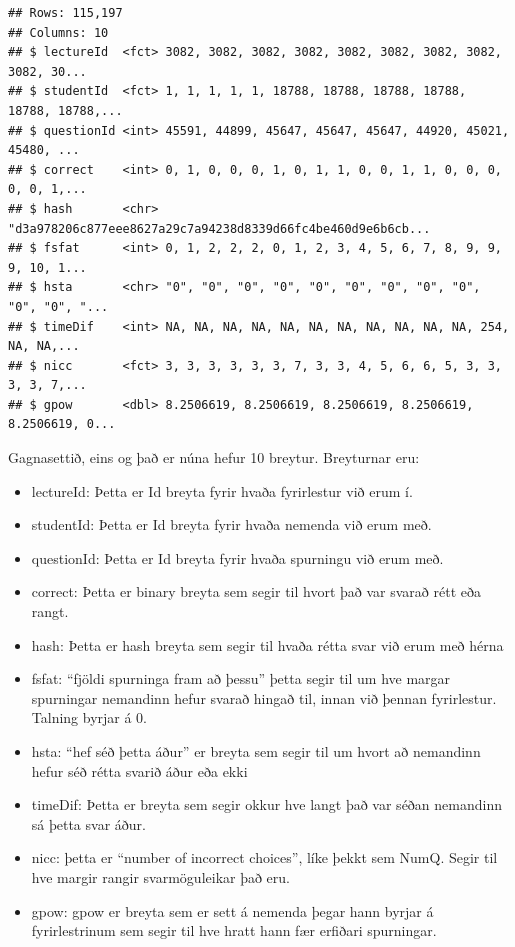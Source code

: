 \documentclass[
]{article}
\begin{document}
\begin{verbatim}
## Rows: 115,197
## Columns: 10
## $ lectureId  <fct> 3082, 3082, 3082, 3082, 3082, 3082, 3082, 3082, 3082, 30...
## $ studentId  <fct> 1, 1, 1, 1, 1, 18788, 18788, 18788, 18788, 18788, 18788,...
## $ questionId <int> 45591, 44899, 45647, 45647, 45647, 44920, 45021, 45480, ...
## $ correct    <int> 0, 1, 0, 0, 0, 1, 0, 1, 1, 0, 0, 1, 1, 0, 0, 0, 0, 0, 1,...
## $ hash       <chr> "d3a978206c877eee8627a29c7a94238d8339d66fc4be460d9e6b6cb...
## $ fsfat      <int> 0, 1, 2, 2, 2, 0, 1, 2, 3, 4, 5, 6, 7, 8, 9, 9, 9, 10, 1...
## $ hsta       <chr> "0", "0", "0", "0", "0", "0", "0", "0", "0", "0", "0", "...
## $ timeDif    <int> NA, NA, NA, NA, NA, NA, NA, NA, NA, NA, NA, 254, NA, NA,...
## $ nicc       <fct> 3, 3, 3, 3, 3, 3, 7, 3, 3, 4, 5, 6, 6, 5, 3, 3, 3, 3, 7,...
## $ gpow       <dbl> 8.2506619, 8.2506619, 8.2506619, 8.2506619, 8.2506619, 0...
\end{verbatim}

Gagnasettið, eins og það er núna hefur 10 breytur. Breyturnar eru:

\begin{itemize}
\item
  lectureId: Þetta er Id breyta fyrir hvaða fyrirlestur við erum í.
\item
  studentId: Þetta er Id breyta fyrir hvaða nemenda við erum með.
\item
  questionId: Þetta er Id breyta fyrir hvaða spurningu við erum með.
\item
  correct: Þetta er binary breyta sem segir til hvort það var svarað rétt eða rangt.
\item
  hash: Þetta er hash breyta sem segir til hvaða rétta svar við erum með hérna
\item
  fsfat: ``fjöldi spurninga fram að þessu'' þetta segir til um hve margar spurningar nemandinn hefur svarað hingað til, innan við þennan fyrirlestur. Talning byrjar á 0.
\item
  hsta: ``hef séð þetta áður'' er breyta sem segir til um hvort að nemandinn hefur séð rétta svarið áður eða ekki
\item
  timeDif: Þetta er breyta sem segir okkur hve langt það var séðan nemandinn sá þetta svar áður.
\item
  nicc: þetta er ``number of incorrect choices'', líke þekkt sem NumQ. Segir til hve margir rangir svarmöguleikar það eru.
\item
  gpow: gpow er breyta sem er sett á nemenda þegar hann byrjar á fyrirlestrinum sem segir til hve hratt hann fær erfiðari spurningar.
\end{itemize}
\end{document}

